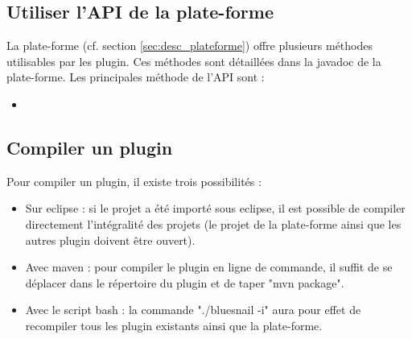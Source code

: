 \subsection{Utiliser l'API de la plate-forme}

    La plate-forme (cf. section \ref{sec:desc_plateforme}) offre plusieurs méthodes utilisables par les plugin. Ces méthodes sont détaillées dans la javadoc de la plate-forme. Les principales méthode de l'API sont :
    
    \begin{itemize}
        \item 
    \end{itemize}

\subsection{Compiler un plugin}
    Pour compiler un plugin, il existe trois possibilités :
    \begin{itemize}
        \item Sur eclipse : si le projet a été importé sous eclipse, il est possible de compiler directement l'intégralité des projets (le projet de la plate-forme ainsi que les autres plugin doivent être ouvert).
        \item Avec maven : pour compiler le plugin en ligne de commande, il suffit de se déplacer dans le répertoire du plugin et de taper "mvn package".
        \item Avec le script bash : la commande "./bluesnail -i" aura pour effet de recompiler tous les plugin existants ainsi que la plate-forme.
    \end{itemize}